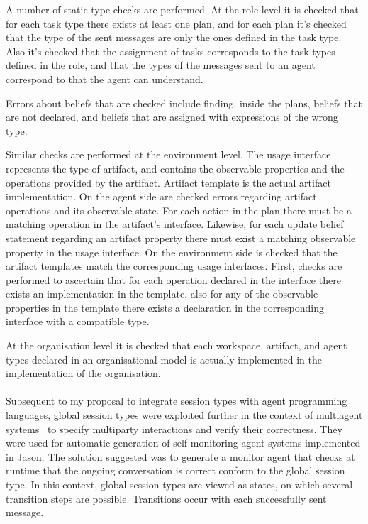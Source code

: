 \documentclass[a4paper,12pt,oneside,fleqn]{book} %
\begin{document}
A number of static type checks are performed. At the role level it is
checked that for each task type there exists at least one plan, and for
each plan it's checked that the type of the sent messages are only the ones
defined in the task type. Also it's checked that the assignment of tasks
corresponds to the task types defined in the role, and that the types of
the messages sent to an agent correspond to that the agent can understand.

Errors about beliefs that are checked include finding, inside the plans,
beliefs that are not declared, and beliefs that are assigned with
expressions of the wrong type.

Similar checks are performed at the environment level. The usage interface
represents the type of artifact, and contains the observable properties and
the operations provided by the artifact. Artifact template is the actual
artifact implementation. On the agent side are checked errors regarding
artifact operations and its observable state. For each action in the plan
there must be a matching operation in the artifact's interface.  Likewise,
for each update belief statement regarding an artifact property there must
exist a matching observable property in the usage interface. On the
environment side is checked that the artifact templates match the
corresponding usage interfaces. First, checks are performed to ascertain
that for each operation declared in the interface there exists an
implementation in the template, also for any of the observable properties
in the template there exists a declaration in the corresponding interface
with a compatible type.

At the organisation level it is checked that each workspace, artifact, and
agent types declared in an organisational model is actually implemented in
the implementation of the organisation.
\\~\\

Subsequent to my proposal to integrate session types with agent programming
languages, global session types were exploited further in the context of
multiagent systems~\cite{DBLP:conf/dalt/AnconaDM12} to specify multiparty
interactions and verify their correctness. They were used for automatic
generation of self-monitoring agent systems implemented in Jason. The
solution suggested was to generate a monitor agent that checks at runtime
that the ongoing conversation is correct conform to the global session
type. In this context, global session types are viewed as states, on which
several transition steps are possible. Transitions occur with each
successfully sent message.
\end{document}
